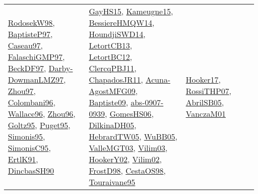 {\begin{longtable}{lp{3cm}>{\raggedright}p{6cm}>{\raggedright}p{6cm}p{8cm}}
\href{papers/RodosekW98.pdf}{RodosekW98}\cite{RodosekW98}, \href{papers/BaptisteP97.pdf}{BaptisteP97}\cite{BaptisteP97}, \href{papers/Caseau97.pdf}{Caseau97}\cite{Caseau97}, \href{articles/FalaschiGMP97.pdf}{FalaschiGMP97}\cite{FalaschiGMP97}, \href{papers/BeckDF97.pdf}{BeckDF97}\cite{BeckDF97}, \href{articles/Darby-DowmanLMZ97.pdf}{Darby-DowmanLMZ97}\cite{Darby-DowmanLMZ97}, \href{articles/Zhou97.pdf}{Zhou97}\cite{Zhou97}, \href{papers/Colombani96.pdf}{Colombani96}\cite{Colombani96}, \href{articles/Wallace96.pdf}{Wallace96}\cite{Wallace96}, \href{papers/Zhou96.pdf}{Zhou96}\cite{Zhou96}, \href{papers/Goltz95.pdf}{Goltz95}\cite{Goltz95}, \href{papers/Puget95.pdf}{Puget95}\cite{Puget95}, \href{papers/Simonis95.pdf}{Simonis95}\cite{Simonis95}, \href{papers/SimonisC95.pdf}{SimonisC95}\cite{SimonisC95}, \href{papers/ErtlK91.pdf}{ErtlK91}\cite{ErtlK91}, \href{articles/DincbasSH90.pdf}{DincbasSH90}\cite{DincbasSH90} & \href{papers/GayHS15.pdf}{GayHS15}\cite{GayHS15}, \href{articles/Kameugne15.pdf}{Kameugne15}\cite{Kameugne15}, \href{papers/BessiereHMQW14.pdf}{BessiereHMQW14}\cite{BessiereHMQW14}, \href{papers/HoundjiSWD14.pdf}{HoundjiSWD14}\cite{HoundjiSWD14}, \href{papers/LetortCB13.pdf}{LetortCB13}\cite{LetortCB13}, \href{papers/LetortBC12.pdf}{LetortBC12}\cite{LetortBC12}, \href{papers/ClercqPBJ11.pdf}{ClercqPBJ11}\cite{ClercqPBJ11}, \href{papers/ChapadosJR11.pdf}{ChapadosJR11}\cite{ChapadosJR11}, \href{papers/Acuna-AgostMFG09.pdf}{Acuna-AgostMFG09}\cite{Acuna-AgostMFG09}, \href{papers/Baptiste09.pdf}{Baptiste09}\cite{Baptiste09}, \href{articles/abs-0907-0939.pdf}{abs-0907-0939}\cite{abs-0907-0939}, \href{papers/GomesHS06.pdf}{GomesHS06}\cite{GomesHS06}, \href{papers/DilkinaDH05.pdf}{DilkinaDH05}\cite{DilkinaDH05}, \href{papers/HebrardTW05.pdf}{HebrardTW05}\cite{HebrardTW05}, \href{papers/WuBB05.pdf}{WuBB05}\cite{WuBB05}, \href{papers/ValleMGT03.pdf}{ValleMGT03}\cite{ValleMGT03}, \href{papers/Vilim03.pdf}{Vilim03}\cite{Vilim03}, \href{papers/HookerY02.pdf}{HookerY02}\cite{HookerY02}, \href{papers/Vilim02.pdf}{Vilim02}\cite{Vilim02}, \href{papers/FrostD98.pdf}{FrostD98}\cite{FrostD98}, \href{papers/CestaOS98.pdf}{CestaOS98}\cite{CestaOS98}, \href{papers/Touraivane95.pdf}{Touraivane95}\cite{Touraivane95} & \href{papers/Hooker17.pdf}{Hooker17}\cite{Hooker17}, \href{papers/RossiTHP07.pdf}{RossiTHP07}\cite{RossiTHP07}, \href{papers/AbrilSB05.pdf}{AbrilSB05}\cite{AbrilSB05}, \href{papers/VanczaM01.pdf}{VanczaM01}\cite{VanczaM01}\\

\end{longtable}}
